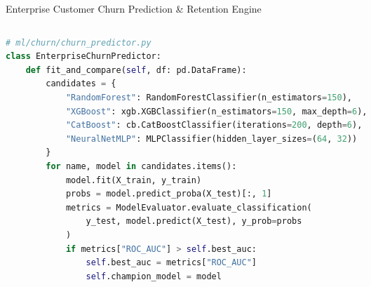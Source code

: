 \documentclass[10pt]{beamer}
\begin{document}
\begin{frame}[fragile]{Enterprise Customer Churn Prediction \& Retention Engine}
\begin{columns}[T]
\begin{column}{0.46\textwidth}
\begin{lstlisting}[language=Python]
# ml/churn/churn_predictor.py
class EnterpriseChurnPredictor:
    def fit_and_compare(self, df: pd.DataFrame):
        candidates = {
            "RandomForest": RandomForestClassifier(n_estimators=150),
            "XGBoost": xgb.XGBClassifier(n_estimators=150, max_depth=6),
            "CatBoost": cb.CatBoostClassifier(iterations=200, depth=6),
            "NeuralNetMLP": MLPClassifier(hidden_layer_sizes=(64, 32))
        }
        for name, model in candidates.items():
            model.fit(X_train, y_train)
            probs = model.predict_proba(X_test)[:, 1]
            metrics = ModelEvaluator.evaluate_classification(
                y_test, model.predict(X_test), y_prob=probs
            )
            if metrics["ROC_AUC"] > self.best_auc:
                self.best_auc = metrics["ROC_AUC"]
                self.champion_model = model
\end{lstlisting}
    \end{column}
\end{columns}
\end{frame}
\end{document}
